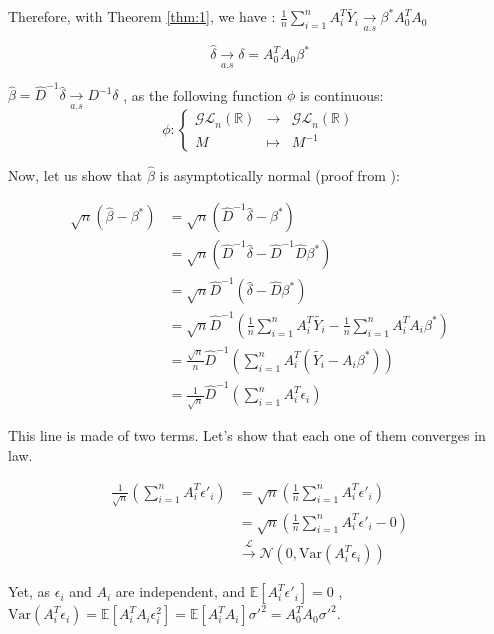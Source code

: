 Therefore, with Theorem \ref{thm:1}, we have :  $\frac{1}{n} \sum_{i=1}^{n} A_i ^T \tilde{Y_i} \underset{a.s}{\rightarrow}  \beta ^*  A_0 ^T A_0 $

\[
\hat{\delta}   \underset{a.s}{\rightarrow}  \delta = A_0 ^T A_0 \beta^*
\] 

$ \hat{\beta} = \hat{D}^{-1} \hat{\delta}  \underset{a.s}{\rightarrow}  D^{-1} \delta $ , as the following function $\phi$ is continuous:
\[
\phi: \left\{
\begin{array}{rcl}
\mathcal{GL}_n(\mathbb{R}) & \to & \mathcal{GL}_n(\mathbb{R}) \\
M & \mapsto & M^{-1}
\end{array}
\right.
\]


Now, let us show that $\hat{\beta}$ is asymptotically normal (proof from \cite{powellasymptoticsforleastsquares}): 

\begin{align*}
    \sqrt{n} (\hat{\beta} - \beta ^*) &= \sqrt{n} (\hat{D}^{-1} \hat{\delta} - \beta ^*) \\
     &= \sqrt{n} (\hat{D}^{-1} \hat{\delta} - \hat{D}^{-1} \hat{D} \beta ^*) \\
     &= \sqrt{n} \hat{D}^{-1} (\hat{\delta} -  \hat{D} \beta ^*)  \\
     &= \sqrt{n} \hat{D}^{-1} \left(\frac{1}{n} \sum_{i=1}^{n} A_i ^T \tilde{Y_i} - \frac{1}{n}  \sum_{i=1}^{n}  A_i ^T A_i \beta ^* \right)  \\
     &= \frac{\sqrt{n}}{n} \hat{D}^{-1} \left(\sum_{i=1}^{n} A_i ^T (\tilde{Y_i} -    A_i \beta ^*) \right)   \\
     &= \frac{1}{\sqrt{n}}  \hat{D} ^{-1} \left(\sum_{i=1}^{n}  A_i ^T \epsilon _ i \right)  
\end{align*}

This line is made of two terms. Let's show that each one of them converges in law. 

\begin{align*}
    \frac{1}{\sqrt{n}} \left(\sum_{i=1}^{n}  A_i^T \epsilon'_i \right) &= \sqrt{n} \left(\frac{1}{n} \sum_{i=1}^{n}  A_i^T \epsilon'_i \right) \\
    &= \sqrt{n} \left(\frac{1}{n} \sum_{i=1}^{n}  A_i^T \epsilon'_i - 0 \right) \\
    &\xrightarrow{\mathcal{L}} \mathcal{N}(0, \text{Var}(A_i^T \epsilon_i))
\end{align*}


Yet, as $\epsilon_i $ and $  A_i $ are independent, and $\mathbb{E} [ A_i^T \epsilon'_i] = 0 $ , $\text{Var}(A_i^T \epsilon_i) = \mathbb{E}[A_i ^T A_i \epsilon_i ^2 ] = \mathbb{E} [ A_i ^T A_i ] \sigma'^2 =A_0^T A_0 \sigma'^2  $. 

